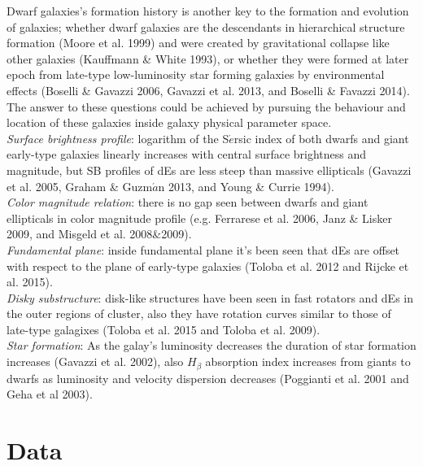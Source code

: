 \documentclass{aa}
\begin{document}
Dwarf galaxies's formation history is another key to the formation and evolution of galaxies; whether dwarf galaxies are the descendants in hierarchical structure formation (Moore et al. 1999) and were created by gravitational collapse like other galaxies (Kauffmann \& White 1993), or whether they were formed at later epoch from late-type low-luminosity star forming galaxies by environmental effects (Boselli \& Gavazzi 2006, Gavazzi et al. 2013, and Boselli \& Favazzi 2014). The answer to these questions could be achieved by pursuing the behaviour and location of these galaxies inside galaxy physical parameter space. \\ \textit{Surface brightness profile}: logarithm of the S$\acute{e}$rsic index of both dwarfs and giant early-type galaxies linearly increases with central surface brightness and magnitude, but SB profiles of dEs are less steep than massive ellipticals (Gavazzi et al. 2005, Graham \& Guzm$\acute{a}$n 2013, and Young \& Currie 1994). \\ \textit{Color magnitude relation}: there is no gap seen between dwarfs and giant ellipticals in color magnitude profile (e.g. Ferrarese et al. 2006, Janz \& Lisker 2009, and Misgeld et al. 2008\&2009). \\ \textit{Fundamental plane}: inside fundamental plane it's been seen that dEs are offset with respect to the plane of early-type galaxies (Toloba et al. 2012 and Rijcke et al. 2015). \\ \textit{Disky substructure}: disk-like structures have been seen in fast rotators and dEs in the outer regions of cluster, also they have rotation curves similar to those of late-type galagixes (Toloba et al. 2015 and Toloba et al. 2009). \\ \textit{Star formation}: As the galay's luminosity decreases the duration of star formation increases (Gavazzi et al. 2002), also $H_\beta$ absorption index increases from giants to dwarfs as luminosity and velocity dispersion decreases (Poggianti et al. 2001 and Geha et al 2003).  









\section{Data}
\end{document}
